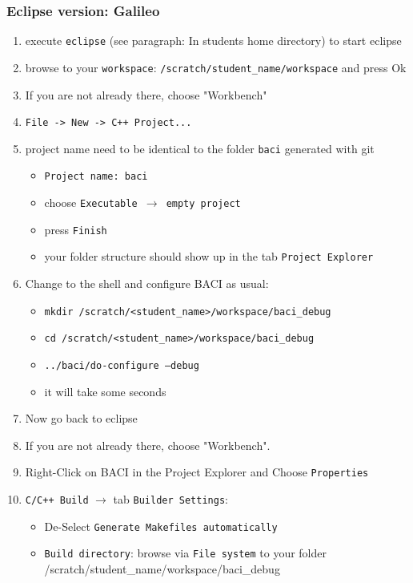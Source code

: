 \subsubsection{Eclipse version: Galileo}

\begin{enumerate}
\item execute \texttt{eclipse} (see paragraph: In students home directory) to start eclipse

\item browse to your \texttt{workspace}: \texttt{/scratch/student\_name/workspace} and press Ok

\item If you are not already there, choose "Workbench"

\item \texttt{File -> New -> C++ Project...}

\item project name need to be identical to the folder \texttt{baci} generated with git
\begin{itemize}
  \item \texttt{Project name: baci} 
  \item choose \texttt{Executable $\rightarrow$ empty project} 
  \item press \texttt{Finish}
  \item your folder structure should show up in the tab \texttt{Project Explorer} 
\end{itemize}

\item Change to the shell and configure BACI as usual:
\begin{itemize}
  \item \texttt{mkdir /scratch/<student\_name>/workspace/baci\_debug}
  \item \texttt{cd /scratch/<student\_name>/workspace/baci\_debug}
  \item \texttt{../baci/do-configure --debug}
  \item it will take some seconds
\end{itemize}

\item Now go back to eclipse

\item If you are not already there, choose "Workbench".

\item Right-Click on BACI in the Project Explorer and Choose \texttt{Properties}

\item \texttt{C/C++ Build} $ \rightarrow $ tab \texttt{Builder Settings}:
\begin{itemize}
 \item De-Select \texttt{Generate Makefiles automatically}
 \item \texttt{Build directory}: browse via \texttt{File system} to your folder \\
 /scratch/student\_name/workspace/baci\_debug
\end{itemize}


\end{enumerate}
